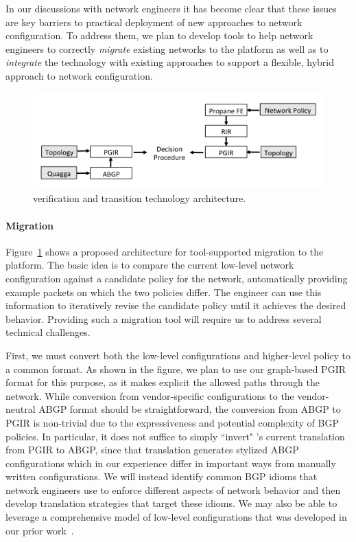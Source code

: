 In our discussions with network engineers it has become clear that these issues are key barriers to practical deployment of new approaches to network configuration.  To address them, we plan to develop tools to help network engineers to correctly {\em migrate} existing networks to the \Propane platform as well as to {\em integrate} the \Propane technology with existing approaches to support a flexible, hybrid approach to network configuration.


\begin{figure}
  \centering
  \includegraphics[width=.9\textwidth]{figures/transition-tech-arch}
\caption{\Propane verification and transition technology architecture.}
\label{fig:transition-tech}
\end{figure}

\paragraph{Migration}  Figure~\ref{fig:transition-tech} shows a proposed architecture for tool-supported migration to the \Propane platform.  The basic idea is to compare the current low-level network configuration against a candidate \Propane policy for the network, automatically providing example packets on which the two policies differ.  The engineer can use this information to iteratively revise the candidate \Propane policy until it achieves the desired behavior.  Providing such a migration tool will require us to address several technical challenges.  

First, we must convert both the low-level configurations and higher-level policy to a common format.  As shown in the figure, we plan to use our graph-based PGIR format for this purpose, as it makes explicit the allowed paths through the network.  While conversion from vendor-specific configurations to the vendor-neutral ABGP format should be straightforward, the conversion from ABGP to PGIR is non-trivial due to the expressiveness and potential complexity of BGP policies.  In particular, it does not suffice to simply ``invert" \Propane's current translation from PGIR to ABGP, since that translation generates stylized ABGP configurations which in our experience differ in important ways from manually written configurations.  We will instead identify common BGP idioms that network engineers use to enforce different aspects of network behavior and then develop translation strategies that target these idioms.  We may also be able to leverage a comprehensive model of low-level configurations that was developed in our prior work~\cite{}.

